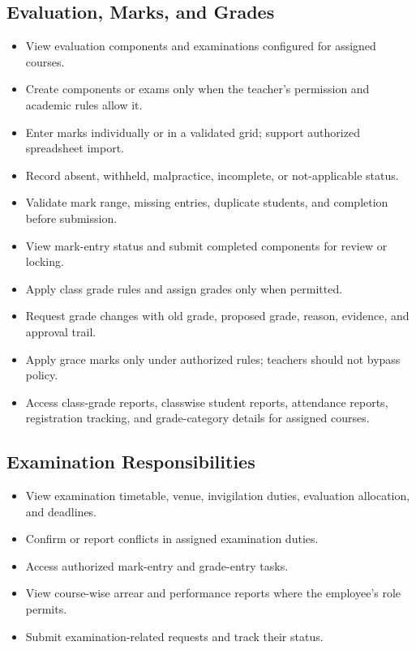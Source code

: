 \documentclass[10pt,a4paper]{article}
\begin{document}
\subsection{Evaluation, Marks, and Grades}
\begin{itemize}
  \item View evaluation components and examinations configured for assigned courses.
  \item Create components or exams only when the teacher's permission and academic rules allow it.
  \item Enter marks individually or in a validated grid; support authorized spreadsheet import.
  \item Record absent, withheld, malpractice, incomplete, or not-applicable status.
  \item Validate mark range, missing entries, duplicate students, and completion before submission.
  \item View mark-entry status and submit completed components for review or locking.
  \item Apply class grade rules and assign grades only when permitted.
  \item Request grade changes with old grade, proposed grade, reason, evidence, and approval trail.
  \item Apply grace marks only under authorized rules; teachers should not bypass policy.
  \item Access class-grade reports, classwise student reports, attendance reports,
        registration tracking, and grade-category details for assigned courses.
\end{itemize}

\subsection{Examination Responsibilities}
\begin{itemize}
  \item View examination timetable, venue, invigilation duties, evaluation allocation, and deadlines.
  \item Confirm or report conflicts in assigned examination duties.
  \item Access authorized mark-entry and grade-entry tasks.
  \item View course-wise arrear and performance reports where the employee's role permits.
  \item Submit examination-related requests and track their status.
\end{itemize}
\end{document}
